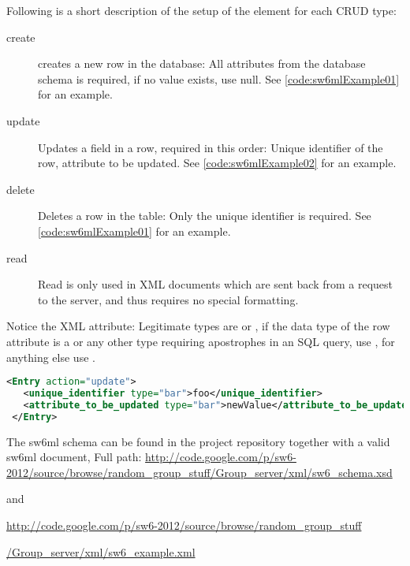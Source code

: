 Following is a short description of the setup of the  element for each CRUD type:

\begin{description}
 \item[create] creates a new row in the database: All attributes from the database schema is required, if no value exists, use null. See \autoref{code:sw6mlExample01} for an example.
 \item[update] Updates a field in a row, required in this order: Unique identifier of the row, attribute to be updated. See \autoref{code:sw6mlExample02} for an example.
 \item[delete] Deletes a row in the table: Only the unique identifier is required. See \autoref{code:sw6mlExample01} for an example.
 \item[read]   Read is only used in XML documents which are sent back from a request to the server, and thus requires no special formatting.
\end{description}

Notice the  XML attribute: Legitimate types are  or , if the data type of the row attribute is a  or any other type requiring apostrophes
in an SQL query, use , for anything else use .

\begin{Code}
\begin{lstlisting}[label=code:sw6mlExample02,language=XML,caption=sw6ml update syntax example]
 <Entry action="update">
   <unique_identifier type="bar">foo</unique_identifier>
   <attribute_to_be_updated type="bar">newValue</attribute_to_be_updated>
 </Entry>
\end{lstlisting}
\end{Code}

The sw6ml schema can be found in the project repository together with a valid sw6ml document,
Full path: \url{http://code.google.com/p/sw6-2012/source/browse/random_group_stuff/Group_server/xml/sw6_schema.xsd}

\noindent and 

\noindent \url{http://code.google.com/p/sw6-2012/source/browse/random_group_stuff} 

\noindent \url{/Group_server/xml/sw6_example.xml} %